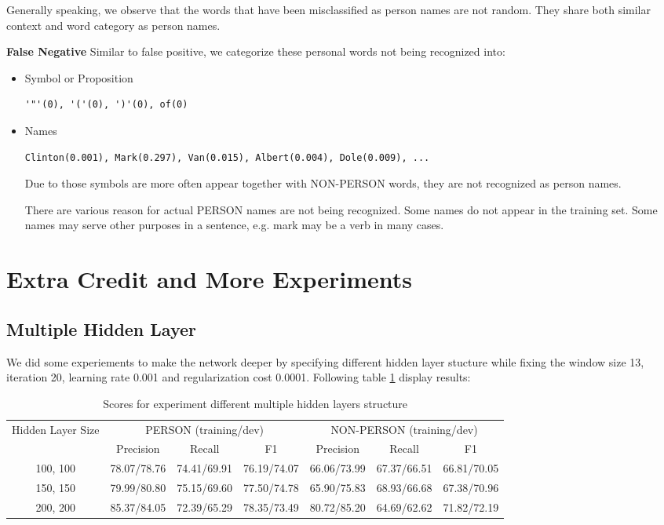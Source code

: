 \documentclass[letterpaper]{article}
\begin{document}
Generally speaking, we observe that the words that have been misclassified as person names are not random. They share both similar context and word category as person names.

\vspace{0.1cm}

\textbf{False Negative} Similar to false positive, we categorize these personal words not being recognized into:
\begin{itemize}
\item Symbol or Proposition
\begin{verbatim}
'"'(0), '('(0), ')'(0), of(0)
\end{verbatim}
\item Names
\begin{verbatim}
Clinton(0.001), Mark(0.297), Van(0.015), Albert(0.004), Dole(0.009), ...
\end{verbatim}

Due to those symbols are more often appear together with NON-PERSON words, they are not recognized as person names.

There are various reason for actual PERSON names are not being recognized. Some names do not appear in the training set. Some names may serve other purposes in a sentence, e.g. mark may be a verb in many cases.
\end{itemize}


\section{Extra Credit and More Experiments}


\subsection{Multiple Hidden Layer}
We did some experiements to make the network deeper by specifying different hidden layer stucture while fixing the window size 13, iteration 20, learning rate 0.001 and regularization cost 0.0001. Following table \ref{tab:multihidden} display results:
\begin{table}[h]
\begin{center}
\begin{tabular}{|c|c|c|c|c|c|c|}
\hline
\multirow{2}{*}{Hidden Layer Size} & 
\multicolumn{3}{c|}{PERSON (training/dev)} & \multicolumn{3}{c|}{NON-PERSON (training/dev)} \\
\hhline{~------}
& Precision & Recall & F1 & Precision & Recall & F1 \\
\hline
100, 100 & 78.07/78.76 & 74.41/69.91 & 76.19/74.07 
& 66.06/73.99 & 67.37/66.51 & 66.81/70.05 \\
\hline
150, 150 & 79.99/80.80 & 75.15/69.60 & 77.50/74.78 
& 65.90/75.83 & 68.93/66.68 & 67.38/70.96 \\
\hline
200, 200 & 85.37/84.05 & 72.39/65.29 & 78.35/73.49
& 80.72/85.20 & 64.69/62.62 & 71.82/72.19 \\
\hline
\end{tabular}
\caption{Scores for experiment different multiple hidden layers structure}
\label{tab:multihidden}
\end{center}
\end{table}
\end{document}
